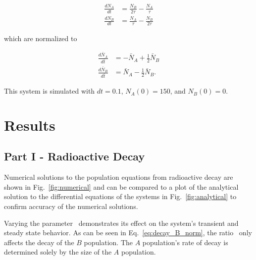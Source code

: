 \documentclass[pra,twocolumn,showpacs,amsmath,amssymb]{revtex4-1}
\begin{document}
\begin{align}
  \frac{d N_A}{dt} &= \frac{N_B}{2 \tau} - \frac{N_A}{\tau} \\
  \frac{d N_B}{dt} &= \frac{N_A}{\tau} - \frac{N_B}{2 \tau}
\end{align}

which are normalized to

\begin{align}
  \frac{d \bar N_A}{d \bar t} &= -  \bar N_A + \frac{1}{2} \bar N_B \label{eq:res_A_norm} \\
  \frac{d \bar N_B}{d \bar t} &=  \bar N_A - \frac{1}{2} \bar N_B \label{eq:res_B_norm}.
\end{align}

This system is simulated with $dt=0.1$, $N_A(0)=150$, and $N_B(0)=0$.



\section{Results}

\subsection{Part I - Radioactive Decay}\label{sec:decay}

Numerical solutions to the population equations from radioactive decay
 are shown in Fig.~\ref{fig:numerical} and can be compared to
a plot of the analytical solution to the differential equations of the systems
in Fig.~\ref{fig:analytical} to confirm accuracy of the numerical solutions.

Varying the parameter \trel~demonstrates its effect on the
system's transient and steady state behavior.
As can be seen in Eq.~\ref{eq:decay_B_norm}, the ratio
 \trel~only affects the decay of the $B$ population. The $A$
 population's rate of decay is determined solely by the size of the $A$ population.
\end{document}
